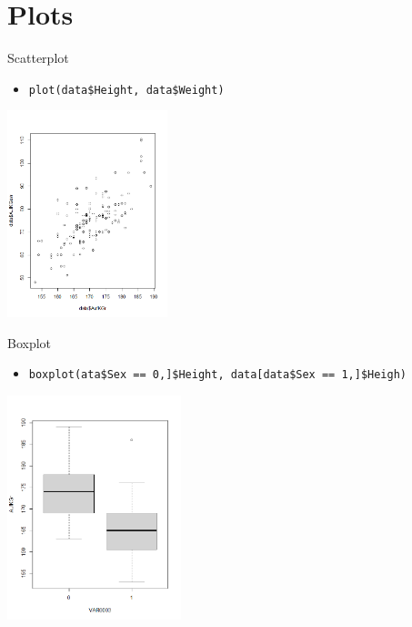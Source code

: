 \documentclass[xcolor=dvipsnames, aspectratio = 169]{beamer}
\begin{document}

\section{Plots}

\begin{frame}[fragile]{Scatterplot}
	\begin{itemize}
		\item \verb+plot(data$Height, data$Weight)+
	\end{itemize}
			
	\begin{center}
		\includegraphics[height=6cm]{Scatterplot}
	\end{center}
\end{frame}

\begin{frame}[fragile]{Boxplot}
	\begin{itemize}
		\item \verb+boxplot(ata$Sex == 0,]$Height, data[data$Sex == 1,]$Heigh)+
	\end{itemize}
			
	\begin{center}
		\includegraphics[height=6.5cm]{Boxplot}
	\end{center}
\end{frame}
\end{document}
